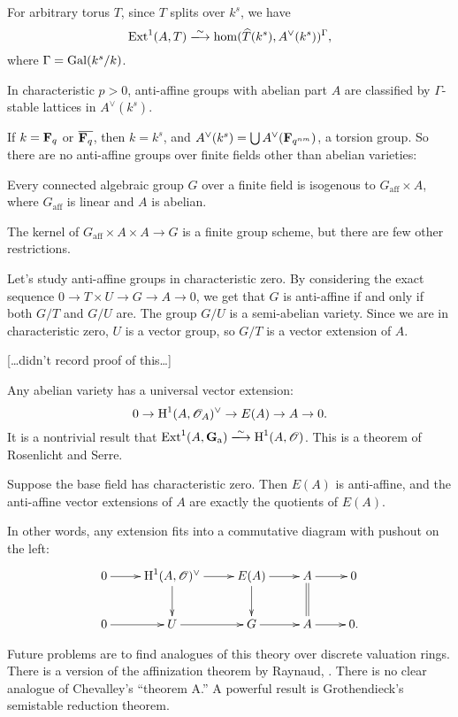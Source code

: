 For arbitrary torus $T$, since $T$ splits over $k^s$, we have 
\[
  \extensions^1(A,T) \isomorphism \hom(\widehat T(k^s),A^\vee(k^s))^\Gamma ,
\]
where $\Gamma=\operatorname{Gal}(k^s/k)$. 

\begin{coro}
In characteristic $p>0$, anti-affine groups with abelian part $A$ are 
classified by $\Gamma$-stable lattices in $A^\vee(k^s)$. 
\end{coro}

If $k=\mathbf{F}_q$ or $\overline{\mathbf{F}_q}$, then $k=k^s$, and 
$A^\vee(k^s)=\bigcup A^\vee(\mathbf{F}_{q^{n m}})$, a torsion group. So there are 
no anti-affine groups over finite fields other than abelian varieties: 

\begin{coro}[Arima '61]
Every connected algebraic group $G$ over a finite field is isogenous to 
$G_\mathrm{aff}\times A$, where $G_\mathrm{aff}$ is linear and $A$ is abelian. 
\end{coro}

The kernel of $G_\mathrm{aff}\times A \times A\to G$ is a finite group scheme, 
but there are few other restrictions. 





Let's study anti-affine groups in characteristic zero. 
By considering the exact sequence $0 \to T\times U \to G\to A \to 0$, we get 
that $G$ is anti-affine if and only if both $G/T$ and $G/U$ are. The group 
$G/U$ is a semi-abelian variety. Since we are in characteristic zero, $U$ is a 
vector group, so $G/T$ is a vector extension of $A$. 

[\ldots didn't record proof of this\ldots]

Any abelian variety has a universal vector extension:
\[
  0 \to \operatorname{H}^1(A,\mathscr{O}_A)^\vee \to E(A) \to A \to 0 .
\]
It is a nontrivial result that 
$\extensions^1(A,\dG_\additive) \isomorphism \h^1(A,\sO)$. This is a theorem of 
Rosenlicht and Serre. 

\begin{prop}
Suppose the base field has characteristic zero. Then $E(A)$ is anti-affine, 
and the anti-affine vector extensions of $A$ are exactly the quotients of 
$E(A)$. 
\end{prop}

In other words, any extension fits into a commutative diagram with pushout on 
the left: 
\[\xymatrix{
  0 \ar[r] 
    & \h^1(A,\sO)^\vee \ar[r] \ar[d] 
    & E(A) \ar[r] \ar[d] 
    & A \ar[r] \ar@{=}[d] 
    & 0 \\
  0 \ar[r] 
    & U \ar[r] 
    & G \ar[r] 
    & A \ar[r] 
    & 0 .
}\]

Future problems are to find analogues of this theory over discrete valuation rings. 
There is a version of the affinization theorem by Raynaud, 
\cite[VI]{sga3}. There is no clear analogue of Chevalley's ``theorem A.'' 
A powerful result is Grothendieck's semistable reduction theorem. 




